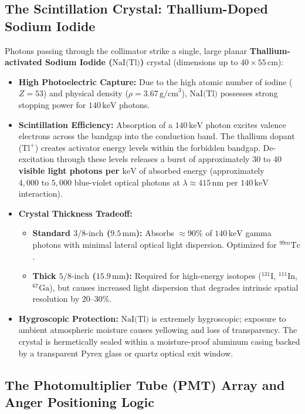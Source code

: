 \documentclass[11pt,a4paper]{article}
\begin{document}
\subsection{The Scintillation Crystal: Thallium-Doped Sodium Iodide}

Photons passing through the collimator strike a single, large planar \textbf{Thallium-activated Sodium Iodide ($\text{NaI(Tl)}$)} crystal (dimensions up to $40 \times 55\,\text{cm}$):
\begin{itemize}[leftmargin=*]
    \item \textbf{High Photoelectric Capture:} Due to the high atomic number of iodine ($Z = 53$) and physical density ($\rho = 3.67\,\text{g/cm}^3$), $\text{NaI(Tl)}$ possesses strong stopping power for $140\,\text{keV}$ photons.
    \item \textbf{Scintillation Efficiency:} Absorption of a $140\,\text{keV}$ photon excites valence electrons across the bandgap into the conduction band. The thallium dopant ($\text{Tl}^+$) creates activator energy levels within the forbidden bandgap. De-excitation through these levels releases a burst of approximately \textbf{$30\text{ to }40$ visible light photons per $\text{keV}$} of absorbed energy (approximately $4{,}000\text{ to }5{,}000$ blue-violet optical photons at $\lambda \approx 415\,\text{nm}$ per $140\,\text{keV}$ interaction).
    \item \textbf{Crystal Thickness Tradeoff:}
    \begin{itemize}
        \item \textbf{Standard $3/8\text{-inch}$ ($9.5\,\text{mm}$):} Absorbs $\approx 90\%$ of $140\,\text{keV}$ gamma photons with minimal lateral optical light dispersion. Optimized for $^{99m}\text{Tc}$.
        \item \textbf{Thick $5/8\text{-inch}$ ($15.9\,\text{mm}$):} Required for high-energy isotopes ($^{131}\text{I}$, $^{111}\text{In}$, $^{67}\text{Ga}$), but causes increased light dispersion that degrades intrinsic spatial resolution by $20\text{--}30\%$.
    \end{itemize}
    \item \textbf{Hygroscopic Protection:} $\text{NaI(Tl)}$ is extremely hygroscopic; exposure to ambient atmospheric moisture causes yellowing and loss of transparency. The crystal is hermetically sealed within a moisture-proof aluminum casing backed by a transparent Pyrex glass or quartz optical exit window.
\end{itemize}

\subsection{The Photomultiplier Tube (PMT) Array and Anger Positioning Logic}
\end{document}
